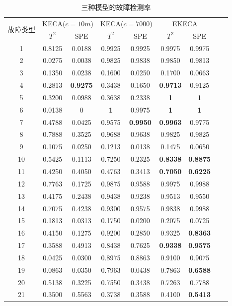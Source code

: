 \begin{table}[!htb]
\centering
\caption{三种模型的故障检测率}
\label{Derate}
\begin{tabular}{ccccccccc}
\hline\hline
 \multirow{2}{*}{故障类型} &
 \multicolumn{2}{c}{KECA($c=10m$)} &
 \multicolumn{2}{c}{KECA($c=7000$)} &
 \multicolumn{2}{c}{EKECA}\\
 \cline{2-7}
  & $T^2$ & SPE & $T^2$ & SPE & $T^2$ & SPE   \\
 \hline
 1& 0.8125 & 0.0188 & 0.9925 & 0.9925 & 0.9975 & 0.9975 \\
 2& 0.0275 & 0.0038 & 0.9825 & 0.9838 & 0.9850 & 0.9813 \\
 3& 0.1350 & 0.0238 & 0.1600 & 0.0250 & 0.1700 & 0.0663 \\
 4& 0.2813 & \textbf{0.9275}	& 0.3438 & 0.1650 & \textbf{0.9713} &0.9125 \\
 5& 0.3200 & 0.0988 & 0.3638 & 0.2338 &\textbf{1} & \textbf{1}      \\	
 6& 0.0138 & 0      & \textbf{1}      & 0.9975 & \textbf{1}      & \textbf{1}      \\		
 7& 0.4788 & 0.0425 & 0.9575 & \textbf{0.9950} & \textbf{0.9963} & 0.9775      \\		
 8& 0.7888 & 0.3525 & 0.9688 & 0.9638 & 0.9825 & 0.9825 \\		
 9& 0.1075 & 0.0250 & 0.1213 & 0.0138 & 0.1475 & 0.0650 \\	
10& 0.5425 & 0.1113 & 0.7250 & 0.2325 & \textbf{0.8338} & \textbf{0.8875} \\		
11& 0.4250 & 0.4050 & 0.4763 & 0.3413 & \textbf{0.7050} & \textbf{0.6225} \\		
12& 0.7763 & 0.1725 & 0.9875 & 0.9588 & 0.9975 & 0.9988 \\		
13& 0.4175 & 0.2438 & 0.9438 & 0.9238 & 0.9513 & 0.9550 \\
14& 0.7075 & 0.4238 & 0.9300 & 0.9575 & 0.9838 & 0.9988 \\
15& 0.1813 & 0.0313 & 0.1750 & 0.0200 & 0.2075 & 0.0725 \\
16& 0.4150 & 0.1275 & 0.9200 & 0.2850 & 0.9325 & \textbf{0.8363} \\
17& 0.3588 & 0.4913 & 0.8438 & 0.7625 & \textbf{0.9338} & \textbf{0.9575} \\
18& 0.0425 & 0.0300 & 0.8975 & 0.8863 & 0.9100 & 0.9075 \\
19& 0.0863 & 0.0350 & 0.7963 & 0.0438 & 0.7863 & \textbf{0.6588} \\
20& 0.5138 & 0.3225 & 0.7550 & 0.3438 & 0.7263 & 0.7788 \\
21& 0.3500 & 0.5563 & 0.3738 & 0.3588 & 0.4100 & \textbf{0.5413} \\
  \hline\hline
\end{tabular}
\end{table}
